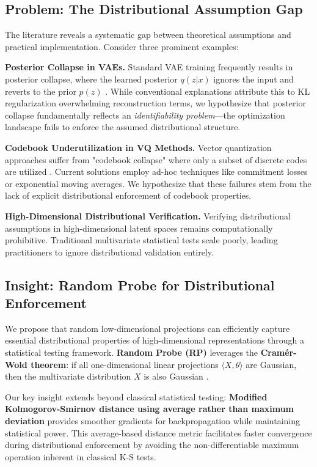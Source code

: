 \documentclass[11pt]{article}
\begin{document}
\subsection{Problem: The Distributional Assumption Gap}

The literature reveals a systematic gap between theoretical assumptions and practical implementation. Consider three prominent examples:

\textbf{Posterior Collapse in VAEs.} Standard VAE training frequently results in posterior collapse, where the learned posterior $q(z|x)$ ignores the input and reverts to the prior $p(z)$ \cite{lucas2019dont,wang2023posterior}. While conventional explanations attribute this to KL regularization overwhelming reconstruction terms, we hypothesize that posterior collapse fundamentally reflects an \emph{identifiability problem}—the optimization landscape fails to enforce the assumed distributional structure.

\textbf{Codebook Underutilization in VQ Methods.} Vector quantization approaches suffer from "codebook collapse" where only a subset of discrete codes are utilized \cite{zheng2023online,fang2025enhancing}. Current solutions employ ad-hoc techniques like commitment losses or exponential moving averages. We hypothesize that these failures stem from the lack of explicit distributional enforcement of codebook properties.

\textbf{High-Dimensional Distributional Verification.} Verifying distributional assumptions in high-dimensional latent spaces remains computationally prohibitive. Traditional multivariate statistical tests scale poorly, leading practitioners to ignore distributional validation entirely.

\subsection{Insight: Random Probe for Distributional Enforcement}

We propose that random low-dimensional projections can efficiently capture essential distributional properties of high-dimensional representations through a statistical testing framework. \textbf{Random Probe (RP)} leverages the \textbf{Cramér-Wold theorem}: if all one-dimensional linear projections $\langle X,\theta \rangle$ are Gaussian, then the multivariate distribution $X$ is also Gaussian \cite{fraiman2021application}.

Our key insight extends beyond classical statistical testing: \textbf{Modified Kolmogorov-Smirnov distance using average rather than maximum deviation} provides smoother gradients for backpropagation while maintaining statistical power. This average-based distance metric facilitates faster convergence during distributional enforcement by avoiding the non-differentiable maximum operation inherent in classical K-S tests.
\end{document}
